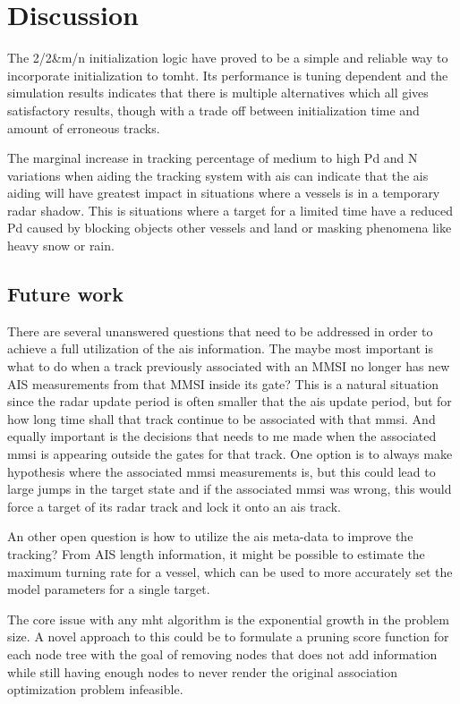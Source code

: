 
\chapter{Discussion}\label{chapter:discussion}
The 2/2\&m/n initialization logic have proved to be a simple and reliable way to incorporate initialization to \gls{tomht}. Its performance is tuning dependent and the simulation results indicates that there is multiple alternatives which all gives satisfactory results, though with a trade off between initialization time and amount of erroneous tracks.

The marginal increase in tracking percentage of medium to high \gls{Pd} and N variations when aiding the tracking system with \gls{ais} can indicate that the \gls{ais} aiding will have greatest impact in situations where a vessels is in a temporary radar shadow. This is situations where a target for a limited time have a reduced \gls{Pd} caused by blocking objects other vessels and land or masking phenomena like heavy snow or rain.

\section{Future work}\label{sec:future-work}
There are several unanswered questions that need to be addressed in order to achieve a full utilization of the \gls{ais} information. The maybe most important is what to do when a track previously associated with an MMSI no longer has new AIS measurements from that MMSI inside its gate? This is a natural situation since the radar update period is often smaller that the \gls{ais} update period, but for how long time shall that track continue to be associated with that \gls{mmsi}. And equally important is the decisions that needs to me made when the associated \gls{mmsi} is appearing outside the gates for that track. One option is to always make hypothesis where the associated \gls{mmsi} measurements is, but this could lead to large jumps in the target state and if the associated \gls{mmsi} was wrong, this would force a target of its radar track and lock it onto an \gls{ais} track.

An other open question is how to utilize the \gls{ais} meta-data to improve the tracking? From AIS length information, it might be possible to estimate the maximum turning rate for a vessel, which can be used to more accurately set the model parameters for a single target.

The core issue with any \gls{mht} algorithm is the exponential growth in the problem size. A novel approach to this could be to formulate a pruning score function for each node tree with the goal of removing nodes that does not add information while still having enough nodes to never render the original association optimization problem infeasible.